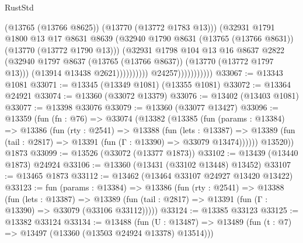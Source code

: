 \begin{lexlean}{RustStd}
\begin{coremodule}
                                          (@13765 (@13766 @8625))
                                          (@13770 (@13772 @1783 @13)))
                                        (@32931
                                          @1791
                                          @1800
                                          @13
                                          @17
                                          @8631
                                          @8639
                                          (@32940
                                            @1790
                                            @8631
                                            (@13765 (@13766 @8631))
                                            (@13770 (@13772 @1790 @13)))
                                          (@32931
                                            @1798
                                            @104
                                            @13
                                            @16
                                            @8637
                                            @2822
                                            (@32940
                                              @1797
                                              @8637
                                              (@13765 (@13766 @8637))
                                              (@13770 (@13772 @1797 @13)))
                                            (@13914 @13438 @2621))))))))))
                          @24257)))))))))))
@33067 := @13343 @1081
@33071 := @13345 (@13349 @1081) (@13355 @1081)
@33072 := @13364 @24921
@33074 := @13360 (@33072 @13379)
@33076 := @13402 (@13403 @1081)
@33077 := @13398 @33076
@33079 := @13360 (@33077 @13427)
@33096 := @13359
    (fun (fn : @76) =>
    @33074
      (@13382
        (@13385
          (fun (params : @13384) =>
          @13386
            (fun (rty : @2541) =>
            @13388
              (fun (lets : @13387) =>
              @13389 (fun (tail : @2817) => @13391 (fun (Γ : @13390) => @33079 @13474))))))
        @13520))
    @1873
@33099 := @13526 (@33072 (@13377 @1873))
@33102 := @13439 (@13440 @1873) @24924
@33106 := @13360 (@13431 (@33102 @13448) @13452)
@33107 := @13465 @1873
@33112 := @13462 (@13464 @33107 @24927 @13420 @13422)
@33123 := fun (params : @13384) =>
  @13386
    (fun (rty : @2541) =>
    @13388
      (fun (lets : @13387) =>
      @13389 (fun (tail : @2817) => @13391 (fun (Γ : @13390) => @33079 (@33106 @33112)))))
@33124 := @13385 @33123
@33125 := @13382 @33124
@33134 := @13488
    (fun (U : @13487) => @13489 (fun (t : @7) => @13497 (@13360 (@13503 @24924 @13378) @13514)))

\end{coremodule}
\end{lexlean}
